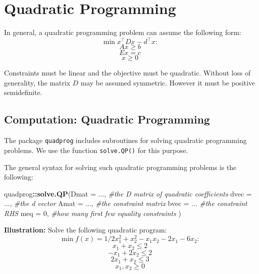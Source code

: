 \documentclass[11pt,]{article}
\newenvironment{Shaded}{\begin{snugshade}}{\end{snugshade}}
\newcommand{\KeywordTok}[1]{\textcolor[rgb]{0.13,0.29,0.53}{\textbf{#1}}}
\newcommand{\DataTypeTok}[1]{\textcolor[rgb]{0.13,0.29,0.53}{#1}}
\newcommand{\DecValTok}[1]{\textcolor[rgb]{0.00,0.00,0.81}{#1}}
\newcommand{\CommentTok}[1]{\textcolor[rgb]{0.56,0.35,0.01}{\textit{#1}}}
\newcommand{\OperatorTok}[1]{\textcolor[rgb]{0.81,0.36,0.00}{\textbf{#1}}}
\newcommand{\NormalTok}[1]{#1}
\begin{document}
\section{Quadratic Programming}\label{quadratic-programming}

In general, a quadratic programming problem can assume the following
form: \[\min{} x^{\top}Dx-d^{\top}x:\] \[Ax\geq b\] \[Ex = c\]
\[x\geq 0\]

Constraints must be linear and the objective must be quadratic. Without
loss of generality, the matrix \(D\) may be assumed symmetric. However
it must be positive semidefinite.

\subsection{Computation: Quadratic
Programming}\label{computation-quadratic-programming}

The package \texttt{quadprog} includes subroutines for solving quadratic
programming problems. We use the function \texttt{solve.QP()} for this
purpose.

The general syntax for solving such quadratic programming problems is
the following:

\begin{Shaded}
\begin{Highlighting}[]
\NormalTok{quadprog}\OperatorTok{::}\KeywordTok{solve.QP}\NormalTok{(}\DataTypeTok{Dmat =}\NormalTok{ ..., }\CommentTok{#the D matrix of quadratic coefficients}
                   \DataTypeTok{dvec =}\NormalTok{ ..., }\CommentTok{#the d vector}
                   \DataTypeTok{Amat =}\NormalTok{ ..., }\CommentTok{#the constraint matrix}
                   \DataTypeTok{bvec =}\NormalTok{ ... }\CommentTok{#the constraint RHS}
                   \DataTypeTok{meq =} \DecValTok{0}\NormalTok{, }\CommentTok{#how many first few equality constraints}
\NormalTok{                  )}
\end{Highlighting}
\end{Shaded}

\textbf{Illustration:} Solve the following quadratic program:
\[\min f(x)=1/2x_1^2+x_2^2-x_1x_2-2x_1-6x_2:\] \[x_1+x_2\leq 2\]
\[-x_1+2x_2\leq 2\] \[2x_1+x_2\leq 3\] \[x_1, x_2\geq 0\]
\end{document}

